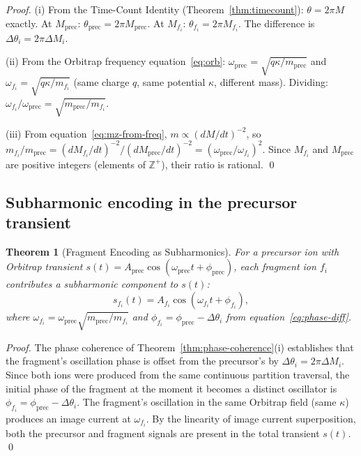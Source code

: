 \documentclass[twocolumn,10pt,a4paper]{article}
\theoremstyle{thmstyle}
\newtheorem{theorem}{Theorem}[section]
\theoremstyle{definition}
\theoremstyle{remark}
\newcommand{\Zp}{\mathbb{Z}^{+}}
\begin{document}
\begin{proof}
(i) From the Time-Count Identity (Theorem~\ref{thm:timecount}):
$\theta = 2\pi M$ exactly. At $M_{\text{prec}}$: $\theta_{\text{prec}} = 2\pi M_{\text{prec}}$.
At $M_{f_i}$: $\theta_{f_i} = 2\pi M_{f_i}$. The difference is
$\Delta\theta_i = 2\pi\Delta M_i$.

(ii) From the Orbitrap frequency equation~\eqref{eq:orb}:
$\omega_{\text{prec}} = \sqrt{q\kappa/m_{\text{prec}}}$ and
$\omega_{f_i} = \sqrt{q\kappa/m_{f_i}}$ (same charge $q$, same
potential $\kappa$, different mass). Dividing:
$\omega_{f_i}/\omega_{\text{prec}} = \sqrt{m_{\text{prec}}/m_{f_i}}$.

(iii) From equation~\eqref{eq:mz-from-freq}, $m \propto (dM/dt)^{-2}$,
so $m_{f_i}/m_{\text{prec}} = (dM_{f_i}/dt)^{-2}/(dM_{\text{prec}}/dt)^{-2}
= (\omega_{\text{prec}}/\omega_{f_i})^2$.
Since $M_{f_i}$ and $M_{\text{prec}}$ are positive integers (elements of $\Zp$),
their ratio is rational. \qed
\end{proof}

\subsection{Subharmonic encoding in the precursor transient}

\begin{theorem}[Fragment Encoding as Subharmonics]
\label{thm:subharmonic}
For a precursor ion with Orbitrap transient
$s(t) = A_{\text{prec}}\cos(\omega_{\text{prec}}t + \phi_{\text{prec}})$,
each fragment ion $f_i$ contributes a subharmonic component to $s(t)$:
\begin{equation}
s_{f_i}(t) = A_{f_i}\cos(\omega_{f_i}t + \phi_{f_i}),
\label{eq:subharmonic}
\end{equation}
where $\omega_{f_i} = \omega_{\text{prec}}\sqrt{m_{\text{prec}}/m_{f_i}}$
and $\phi_{f_i} = \phi_{\text{prec}} - \Delta\theta_i$ from
equation~\eqref{eq:phase-diff}.
\end{theorem}

\begin{proof}
The phase coherence of Theorem~\ref{thm:phase-coherence}(i) establishes
that the fragment's oscillation phase is offset from the precursor's by
$\Delta\theta_i = 2\pi\Delta M_i$. Since both ions were produced from the
same continuous partition traversal, the initial phase of the fragment
at the moment it becomes a distinct oscillator is
$\phi_{f_i} = \phi_{\text{prec}} - \Delta\theta_i$. The fragment's
oscillation in the same Orbitrap field (same $\kappa$) produces an
image current at $\omega_{f_i}$. By the linearity of image current
superposition, both the precursor and fragment signals are present in
the total transient $s(t)$. \qed
\end{proof}
\end{document}

